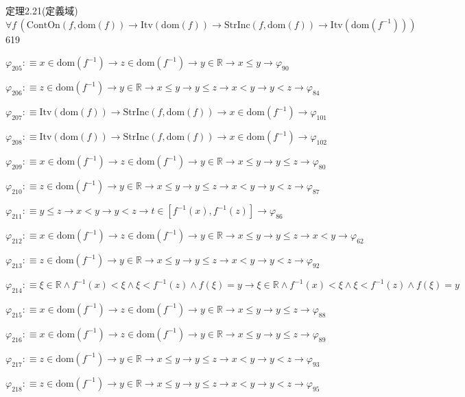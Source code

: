 \begin{fullproof}{定理2.21(定義域)}{$\forall f\,(\mathrm{ContOn}(f,\mathrm{dom}(f)) \to \mathrm{Itv}(\mathrm{dom}(f)) \to \mathrm{StrInc}(f,\mathrm{dom}(f)) \to \mathrm{Itv}(\mathrm{dom}(f^{-1})))$}{619}
\begin{abbrevlist}
\item $\varphi_{205} :\equiv x \in \mathrm{dom}(f^{-1}) \to z \in \mathrm{dom}(f^{-1}) \to y \in \mathbb{R} \to x \leq y \to \varphi_{90}$
\item $\varphi_{206} :\equiv z \in \mathrm{dom}(f^{-1}) \to y \in \mathbb{R} \to x \leq y \to y \leq z \to x < y \to y < z \to \varphi_{84}$
\item $\varphi_{207} :\equiv \mathrm{Itv}(\mathrm{dom}(f)) \to \mathrm{StrInc}(f,\mathrm{dom}(f)) \to x \in \mathrm{dom}(f^{-1}) \to \varphi_{101}$
\item $\varphi_{208} :\equiv \mathrm{Itv}(\mathrm{dom}(f)) \to \mathrm{StrInc}(f,\mathrm{dom}(f)) \to x \in \mathrm{dom}(f^{-1}) \to \varphi_{102}$
\item $\varphi_{209} :\equiv x \in \mathrm{dom}(f^{-1}) \to z \in \mathrm{dom}(f^{-1}) \to y \in \mathbb{R} \to x \leq y \to y \leq z \to \varphi_{80}$
\item $\varphi_{210} :\equiv z \in \mathrm{dom}(f^{-1}) \to y \in \mathbb{R} \to x \leq y \to y \leq z \to x < y \to y < z \to \varphi_{87}$
\item $\varphi_{211} :\equiv y \leq z \to x < y \to y < z \to t \in [f^{-1}(x),f^{-1}(z)] \to \varphi_{86}$
\item $\varphi_{212} :\equiv x \in \mathrm{dom}(f^{-1}) \to z \in \mathrm{dom}(f^{-1}) \to y \in \mathbb{R} \to x \leq y \to y \leq z \to x < y \to \varphi_{62}$
\item $\varphi_{213} :\equiv z \in \mathrm{dom}(f^{-1}) \to y \in \mathbb{R} \to x \leq y \to y \leq z \to x < y \to y < z \to \varphi_{92}$
\item $\varphi_{214} :\equiv \xi \in \mathbb{R} \land f^{-1}(x) < \xi \land \xi < f^{-1}(z) \land f(\xi) = y \to \xi \in \mathbb{R} \land f^{-1}(x) < \xi \land \xi < f^{-1}(z) \land f(\xi) = y$
\item $\varphi_{215} :\equiv x \in \mathrm{dom}(f^{-1}) \to z \in \mathrm{dom}(f^{-1}) \to y \in \mathbb{R} \to x \leq y \to y \leq z \to \varphi_{88}$
\item $\varphi_{216} :\equiv x \in \mathrm{dom}(f^{-1}) \to z \in \mathrm{dom}(f^{-1}) \to y \in \mathbb{R} \to x \leq y \to y \leq z \to \varphi_{89}$
\item $\varphi_{217} :\equiv z \in \mathrm{dom}(f^{-1}) \to y \in \mathbb{R} \to x \leq y \to y \leq z \to x < y \to y < z \to \varphi_{93}$
\item $\varphi_{218} :\equiv z \in \mathrm{dom}(f^{-1}) \to y \in \mathbb{R} \to x \leq y \to y \leq z \to x < y \to y < z \to \varphi_{95}$

\end{abbrevlist}
\end{fullproof}
